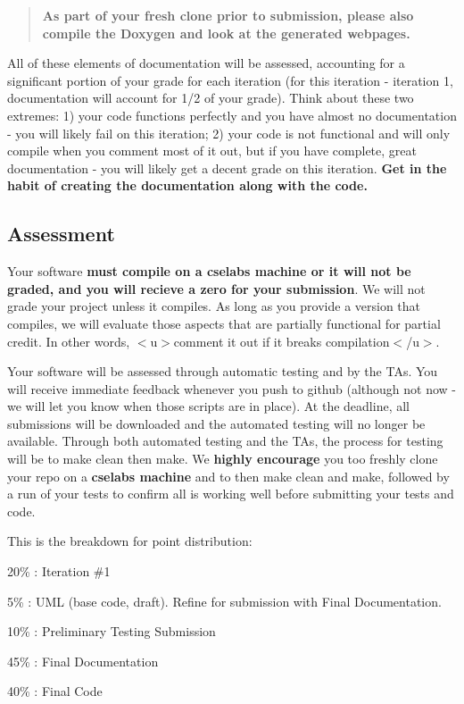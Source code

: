 \begin{quote}
{\bfseries As part of your fresh clone prior to submission, please also compile the Doxygen and look at the generated webpages.} \end{quote}


All of these elements of documentation will be assessed, accounting for a significant portion of your grade for each iteration (for this iteration -\/ iteration 1, documentation will account for 1/2 of your grade). Think about these two extremes\+: 1) your code functions perfectly and you have almost no documentation -\/ you will likely fail on this iteration; 2) your code is not functional and will only compile when you comment most of it out, but if you have complete, great documentation -\/ you will likely get a decent grade on this iteration. {\bfseries Get in the habit of creating the documentation along with the code.}





\subsection*{Assessment}

Your software {\bfseries must compile on a cselabs machine or it will not be graded, and you will recieve a zero for your submission}. We will not grade your project unless it compiles. As long as you provide a version that compiles, we will evaluate those aspects that are partially functional for partial credit. In other words, $<$u$>$comment it out if it breaks compilation$<$/u$>$.

Your software will be assessed through automatic testing and by the T\+As. You will receive immediate feedback whenever you push to github (although not now -\/ we will let you know when those scripts are in place). At the deadline, all submissions will be downloaded and the automated testing will no longer be available. Through both automated testing and the T\+As, the process for testing will be to {\ttfamily make clean} then {\ttfamily make}. We {\bfseries highly encourage} you too freshly clone your repo on a {\bfseries cselabs machine} and to then {\ttfamily make clean} and {\ttfamily make}, followed by a run of your tests to confirm all is working well before submitting your tests and code.

This is the breakdown for point distribution\+:

20\% \+: Iteration \#1
\begin{DoxyItemize}
\item 5\% \+: U\+ML (base code, draft). Refine for submission with Final Documentation.
\item 10\% \+: Preliminary Testing Submission
\item 45\% \+: Final Documentation
\item 40\% \+: Final Code
\end{DoxyItemize}

